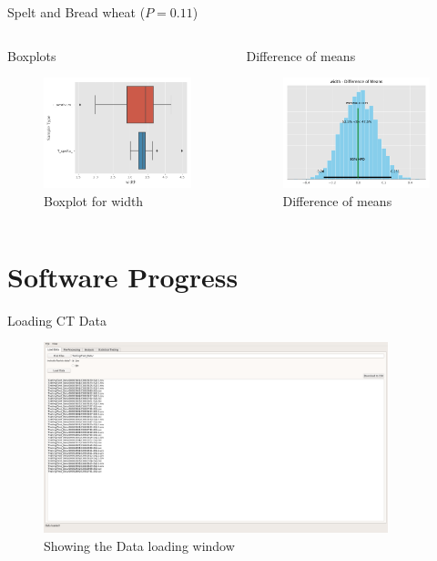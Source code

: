 \documentclass[t, aspectratio=169]{beamer}
\begin{document}
\begin{frame}[label={sec:org67c4da6}]{Spelt and Bread wheat (\(P = 0.11\))}
\begin{columns}
\begin{column}{0.5\columnwidth}
\begin{block}{Boxplots}
\begin{figure}[htbp]
\centering
\includegraphics[width=4.5cm]{./images/speltbox.png}
\caption{\label{fig:org3325aa4}
Boxplot for width}
\end{figure}
\end{block}
\end{column}

\begin{column}{0.5\columnwidth}
\begin{block}{Difference of means}
\begin{figure}[htbp]
\centering
\includegraphics[width=4.5cm]{./images/speltdiff.png}
\caption{\label{fig:orge07c859}
Difference of means}
\end{figure}
\end{block}
\end{column}
\end{columns}
\end{frame}




\section{Software Progress}
\label{sec:org2d007b1}

\begin{frame}[label={sec:org755d612}]{Loading CT Data}
\begin{figure}[htbp]
\centering
\includegraphics[width=10cm]{./images/1.png}
\caption{\label{fig:org48a1774}
Showing the Data loading window}
\end{figure}
\end{frame}
\end{document}
